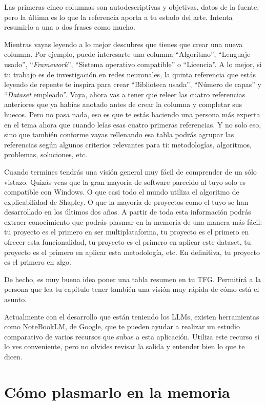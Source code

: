 Las primeras cinco columnas son autodescriptivas y objetivas, datos de la fuente, pero la última es lo que la referencia aporta a tu estado del arte. Intenta resumirlo a una o dos frases como mucho.

Mientras vayas leyendo a lo mejor descubres que tienes que crear una nueva columna. Por ejemplo, puede interesarte una columna ``Algoritmo'', ``Lenguaje usado'', ``\textit{Framework}'', ``Sistema operativo compatible'' o ``Licencia''. A lo mejor, si tu trabajo es de investigación en redes neuronales, la quinta referencia que estás leyendo de repente te inspira para crear ``Biblioteca usada'', ``Número de capas'' y ``\textit{Dataset} empleado''. Vaya, ahora vas a tener que releer las cuatro referencias anteriores que ya habías anotado antes de crear la columna y completar sus huecos. Pero no pasa nada, eso es que te estás haciendo una persona más experta en el tema ahora que cuando leías esas cuatro primeras referencias. Y no solo eso, sino que también conforme vayas rellenando esa tabla podrás agrupar las referencias según algunos criterios relevantes para ti: metodologías, algoritmos, problemas, soluciones, etc.

Cuando termines tendrás una visión general muy fácil de comprender de un sólo vistazo. Quizás veas que la gran mayoría de software parecido al tuyo solo es compatible con Windows. O que casi todo el mundo utiliza el algoritmo de explicabilidad de Shapley. O que la mayoría de proyectos como el tuyo se han desarrollado en los últimos dos años. A partir de toda esta información podrás extraer conocimiento que podrás plasmar en la memoria de una manera más fácil: tu proyecto es el primero en ser multiplataforma, tu proyecto es el primero en ofrecer esta funcionalidad, tu proyecto es el primero en aplicar este dataset, tu proyecto es el primero en aplicar esta metodología, etc. En definitiva, tu proyecto es el primero en algo.

De hecho, es muy buena idea poner una tabla resumen en tu TFG. Permitirá a la persona que lea tu capítulo tener también una visión muy rápida de cómo está el asunto.

Actualmente con el desarrollo que están teniendo los LLMs, existen herramientas como \href{https://notebooklm.google}{NoteBookLM}, de Google, que te pueden ayudar a realizar un estudio comparativo de varios recursos que subas a esta aplicación. Utiliza este recurso si lo ves conveniente, pero no olvides revisar la salida y entender bien lo que te dicen.

\section{Cómo plasmarlo en la memoria}

